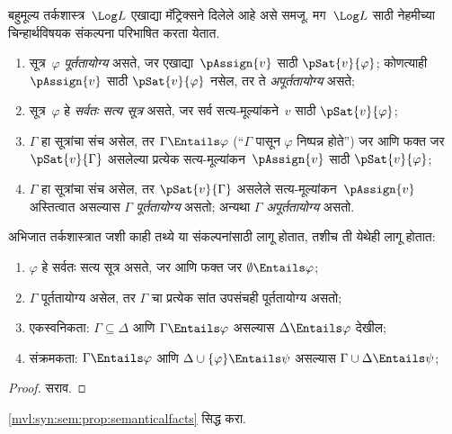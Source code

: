 बहुमूल्य तर्कशास्त्र~$\Log L$ एखाद्या मॅट्रिक्सने दिलेले
आहे असे समजू. मग~$\Log L$ साठी नेहमीच्या चिन्हार्थविषयक
संकल्पना परिभाषित करता येतात.

\begin{defn}
\begin{enumerate}
\item सूत्र~$\varphi$ \emph{पूर्ततायोग्य} असते, जर
  एखाद्या~$\pAssign{v}$ साठी $\pSat{v}{\varphi}$;
  कोणत्याही $\pAssign{v}$ साठी $\pSat{v}{\varphi}$ नसेल, तर ते
  \emph{अपूर्ततायोग्य} असते;
\item सूत्र~$\varphi$ हे \emph{सर्वतः सत्य सूत्र}
  असते, जर सर्व सत्य-मूल्यांकने~$v$ साठी $\pSat{v}{\varphi}$;
\item $\Gamma$ हा सूत्रांचा संच असेल, तर
  $\Gamma \Entails \varphi$ (``$\Gamma$ पासून $\varphi$
  निष्पन्न होते'') जर आणि फक्त जर
  $\pSat{v}{\Gamma}$ असलेल्या प्रत्येक
  सत्य-मूल्यांकन~$\pAssign{v}$ साठी $\pSat{v}{\varphi}$;
\item $\Gamma$ हा सूत्रांचा संच असेल, तर
  $\pSat{v}{\Gamma}$ असलेले सत्य-मूल्यांकन~$\pAssign{v}$
  अस्तित्वात असल्यास $\Gamma$ \emph{पूर्ततायोग्य} असतो;
  अन्यथा $\Gamma$ \emph{अपूर्ततायोग्य} असतो.
\end{enumerate}
\end{defn}

अभिजात तर्कशास्त्रात जशी काही तथ्ये या संकल्पनांसाठी
लागू होतात, तशीच ती येथेही लागू होतात:

\begin{prop}
\label{mvl:syn:sem:prop:semanticalfacts}
\begin{enumerate}
\item $\varphi$ हे सर्वतः सत्य सूत्र असते, जर आणि फक्त जर
  $\emptyset \Entails \varphi$;
\item $\Gamma$ पूर्ततायोग्य असेल, तर $\Gamma$ चा प्रत्येक सांत
  उपसंचही पूर्ततायोग्य असतो;
\item\label{mvl:syn:sem:def:monotonicity}
एकस्वनिकता: $\Gamma \subseteq \Delta$ आणि
  $\Gamma \Entails \varphi$ असल्यास $\Delta \Entails \varphi$ देखील;
\item\label{mvl:syn:sem:def:Cut}
संक्रमकता: $\Gamma \Entails \varphi$ आणि
  $\Delta \cup \{ \varphi\} \Entails \psi$ असल्यास
  $\Gamma \cup \Delta \Entails \psi$;
\end{enumerate}
\end{prop}

\begin{proof}
सराव.
\end{proof}

\begin{prob}
\ref{mvl:syn:sem:prop:semanticalfacts} सिद्ध करा.
\end{prob}

